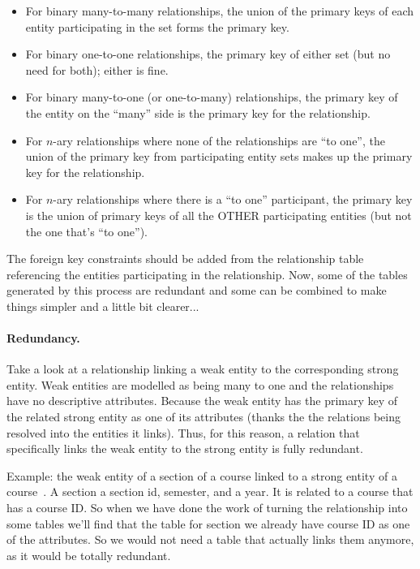 \documentclass[a4paper]{report}
\begin{document}
\begin{itemize}
	\item For binary many-to-many relationships, the union of the primary keys of each entity participating in the set forms the primary key.
	\item For binary one-to-one relationships, the primary key of either set (but no need for both); either is fine.
	\item For binary many-to-one (or one-to-many) relationships, the primary key of the entity on the ``many'' side is the primary key for the relationship.
	\item For $n$-ary relationships where none of the relationships are ``to one'', the union of the primary key from participating entity sets makes up the primary key for the relationship.
	\item For $n$-ary relationships where there is a ``to one'' participant, the primary key is the union of primary keys of all the OTHER participating entities (but not the one that's ``to one''). 
\end{itemize}

The foreign key constraints should be added from the relationship table referencing the entities participating in the relationship. Now, some of the tables generated by this process are redundant and some can be combined to make things simpler and a little bit clearer...

\paragraph{Redundancy.}
Take a look at a relationship linking a weak entity to the corresponding strong entity. Weak entities are modelled as being many to one and the relationships have no descriptive attributes. Because the weak entity has the primary key of the related strong entity as one of its attributes (thanks the the relations being resolved into the entities it links). Thus, for this reason, a relation that specifically links the weak entity to the strong entity is fully redundant. 

Example: the weak entity of a section of a course linked to a strong entity of a course~\cite{dsc}. A section a section id, semester, and a year. It is related to a course that has a course ID. So when we have done the work of turning the relationship into some tables we'll find that the table for section we already have course ID as one of the attributes. So we would not need a table that actually links them anymore, as it would be totally redundant. 
\end{document}
